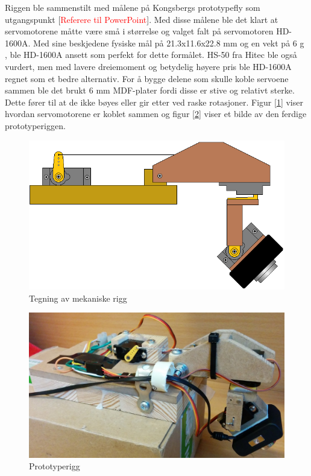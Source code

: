 Riggen ble sammenstilt med målene på Kongsbergs prototypefly som utgangspunkt [\textcolor{red}{Referere til PowerPoint}]. Med disse målene ble det klart at servomotorene måtte være små i størrelse og valget falt på servomotoren HD-1600A. Med sine beskjedene fysiske mål på 21.3x11.6x22.8 mm og en vekt på $6$ g \cite{PowerHD}, ble HD-1600A ansett som perfekt for dette formålet. HS-50 fra Hitec ble også vurdert, men med lavere dreiemoment og betydelig høyere pris ble HD-1600A regnet som et bedre alternativ. For å bygge delene som skulle koble servoene sammen ble det brukt $6$ mm MDF-plater fordi disse er stive og relativt sterke. Dette fører til at de ikke bøyes eller gir etter ved raske rotasjoner. Figur [\ref{fig:RiggTegn}] viser hvordan servomotorene er koblet sammen og figur [\ref{fig:RiggBilde}] viser et bilde av den ferdige prototyperiggen. 

\begin{figure}[h!]
	\centering
	\includegraphics[scale=0.5]{img/RIGG_sattsammen.png}
	\caption{Tegning av mekaniske rigg}
	\label{fig:RiggTegn}
\end{figure}

\begin{figure}[h!]
	\centering
	\includegraphics[scale=0.25]{img/Rigg_Bilde.jpg}
	\caption{Prototyperigg}
	\label{fig:RiggBilde}
\end{figure}

